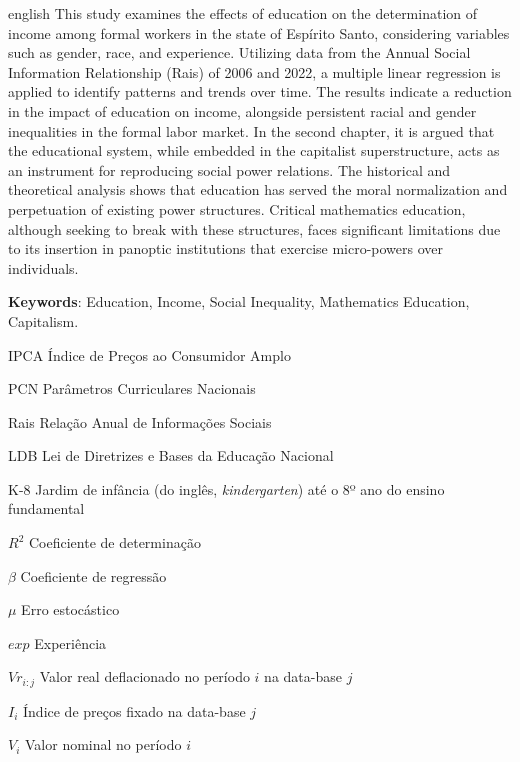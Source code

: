 \begin{resumo}[Abstract]
  \begin{otherlanguage*}{english}
    This study examines the effects of education on the determination of income among formal workers in the state of Espírito Santo, considering variables such as gender, race, and experience. Utilizing data from the Annual Social Information Relationship (Rais) of 2006 and 2022, a multiple linear regression is applied to identify patterns and trends over time. The results indicate a reduction in the impact of education on income, alongside persistent racial and gender inequalities in the formal labor market. In the second chapter, it is argued that the educational system, while embedded in the capitalist superstructure, acts as an instrument for reproducing social power relations. The historical and theoretical analysis shows that education has served the moral normalization and perpetuation of existing power structures. Critical mathematics education, although seeking to break with these structures, faces significant limitations due to its insertion in panoptic institutions that exercise micro-powers over individuals.

    \textbf{Keywords}: Education, Income, Social Inequality, Mathematics Education, Capitalism.
  \end{otherlanguage*}
\end{resumo}

\listoffigures*
\cleardoublepage


\listoftables*
\cleardoublepage

\begin{siglas}
  \item[IPCA] Índice de Preços ao Consumidor Amplo
  \item[PCN] Parâmetros Curriculares Nacionais
  \item[Rais] Relação Anual de Informações Sociais
  \item[LDB] Lei de Diretrizes e Bases da Educação Nacional
  \item[K-8] Jardim de infância (do inglês, \textit{kindergarten}) até o 8º ano do ensino fundamental
\end{siglas}

\begin{simbolos}
  \item[$R^2$] Coeficiente de determinação
  \item[$\beta$] Coeficiente de regressão
  \item[$\mu$] Erro estocástico
  \item[$exp$] Experiência
  \item[$Vr_{i:j}$] Valor real deflacionado no período $i$ na data-base $j$
  \item[$I_i$] Índice de preços fixado na data-base $j$
  \item[$V_i$] Valor nominal no período $i$
\end{simbolos}

\tableofcontents*
\cleardoublepage

\textual
\pagestyle{simple}